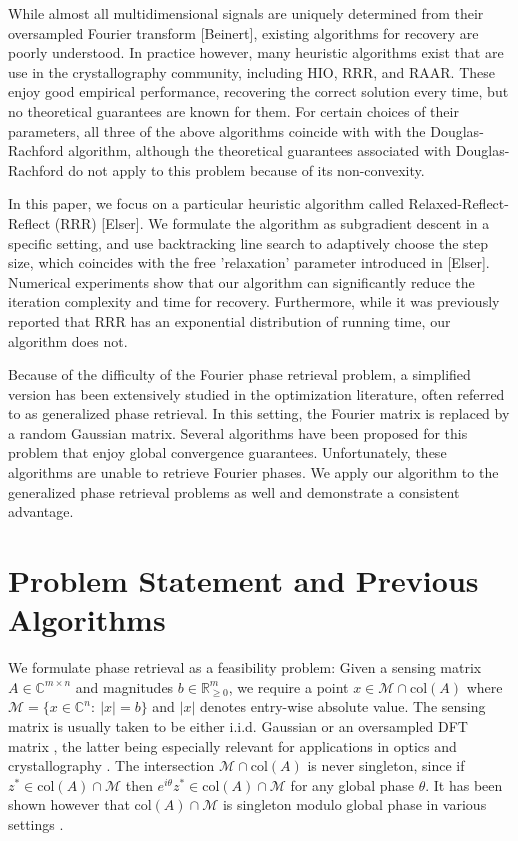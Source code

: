 \documentclass[journal]{IEEEtran}
\theoremstyle{definition}
\theoremstyle{remark}
\theoremstyle{definition}
\theoremstyle{problem}
\theoremstyle{definition}
\newcommand{\col}{\text{col}}
\newcommand{\RR}{\mathbb{R} }
\newcommand{\CC}{\mathbb{C}}
\newcommand{\MM}{\mathcal{M}}
\newcommand{\TODO}[1]{{\color{red}{[#1]}}}
\begin{document}
While almost all multidimensional signals are uniquely determined from their oversampled Fourier transform [Beinert], existing algorithms for recovery are poorly understood. In practice however, many heuristic algorithms exist that are use in the crystallography community, including HIO, RRR, and RAAR. These enjoy good empirical performance, recovering the correct solution every time, but no theoretical guarantees are known for them. For certain choices of their parameters, all three of the above algorithms coincide with with the Douglas-Rachford algorithm, although the theoretical guarantees associated with Douglas-Rachford do not apply to this problem because of its non-convexity. 

In this paper, we focus on a particular heuristic algorithm called Relaxed-Reflect-Reflect (RRR) [Elser]. We formulate the algorithm as subgradient descent in a specific setting, and use backtracking line search to adaptively choose the step size, which coincides with the free 'relaxation' parameter introduced in [Elser]. Numerical experiments show that our algorithm can significantly reduce the iteration complexity and time for recovery. Furthermore, while it was previously reported that RRR has an exponential distribution of running time, our algorithm does not.

Because of the difficulty of the Fourier phase retrieval problem, a simplified version has been extensively studied in the optimization literature, often referred to as generalized phase retrieval. In this setting, the Fourier matrix is replaced by a random Gaussian matrix. Several algorithms have been proposed for this problem that enjoy global convergence guarantees. Unfortunately, these algorithms are unable to retrieve Fourier phases. We apply our algorithm to the generalized phase retrieval problems as well and demonstrate a consistent advantage.

\TODO{Things I think it worth mentioning in the manuscript:
	- explain the DR framework
	- how it fits phase retrieval
	- relation to ADMM (it is more well known in the community)
	- relation with alternating projection 
	- we can also include the different ways to derive the GS algorithm.}

\section{Problem Statement and Previous Algorithms}
We formulate phase retrieval as a feasibility problem: Given a sensing matrix $A\in\CC^{m\times n}$ and magnitudes $b\in\RR^{m}_{\geq 0}$, we require a point $x\in\MM\cap \col(A)$ where $\MM=\{x\in\CC^n:\ |x|=b\}$ and $|x|$ denotes entry-wise absolute value. The sensing matrix is usually taken to be either i.i.d. Gaussian or an oversampled DFT matrix \cite{Bendory2017}, the latter being especially relevant for applications in optics and crystallography \cite{Elser2017, Luke2005}. The intersection $\MM\cap\col(A)$ is never singleton, since if $z^*\in\col(A)\cap\MM$ then $e^{i\theta}z^*\in\col(A)\cap \MM$ for any global phase $\theta$. It has been shown however that $\col(A)\cap\MM$ is singleton modulo global phase in various settings \cite{Bandeira2014,Bendory2017,Conca2015}. \TODO{Expand on this?}
\end{document}
